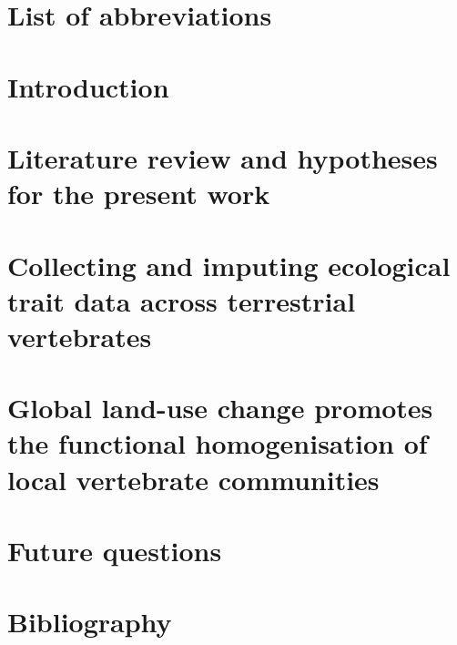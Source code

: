 \documentclass[11pt]{report}
\renewcommand{\baselinestretch}{1.5}
\begin{document}


\chapter*{List of abbreviations}


\begin{counted}
\clearpage
\chapter{Introduction}


\chapter{Literature review and hypotheses for the present work}


\pagebreak
\chapter{Collecting and imputing ecological trait data across terrestrial vertebrates}


\chapter{Global land-use change promotes the functional homogenisation of local  vertebrate communities}


\chapter{Future questions}
%

\end{counted}
\thewords

\clearpage
\chapter*{Bibliography}
\renewcommand{\baselinestretch}{1}
\printbibliography[heading=none]
\end{document}
